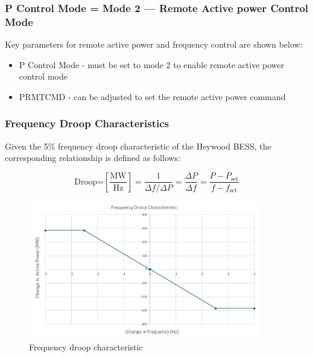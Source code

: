\documentclass{../grid-link-report}
\begin{document}
		\subsubsection{P Control Mode = Mode 2 — Remote Active power Control Mode}
		
		Key parameters for remote active power and frequency control are shown below: 
		
		\begin{itemize}
			\item P Control Mode - must be set to mode 2 to enable remote active power control mode
			\item PRMTCMD - can be adjusted to set the remote active power command
		\end{itemize}
		
		\subsubsection{Frequency Droop Characteristics}
		Given the 5\% frequency droop characteristic of the Heywood BESS, the corresponding relationship is defined as follows:
		
		
		\[
		\text{Droop=} \left[ \frac{\text{MW}}{\text{Hz}} \right] = \frac{1}{\Delta f / \Delta P} = \frac{\Delta P}{\Delta f} = \frac{P - P_{\text{set}}}{f - f_{\text{set}}}
		\]
		
		
		\begin{figure}[H]
			\centering
			\includegraphics[width=0.9\textwidth]{report-assets/images/fdroop-char.png}
			\caption{Frequency droop characteristic}
			\label{fig:fdroop-char}
		\end{figure}
		
\end{document}
